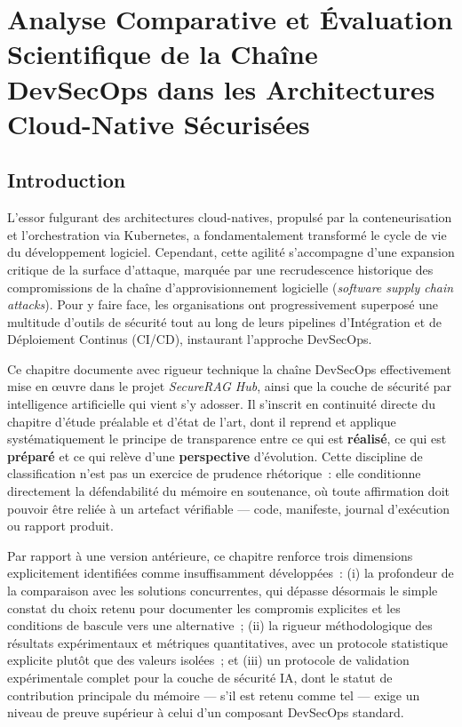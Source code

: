 \chapter{Analyse Comparative et Évaluation Scientifique de la Chaîne DevSecOps dans les Architectures Cloud-Native Sécurisées}
\label{ch:advanced_devsecops_evaluation}

\section{Introduction}

L'essor fulgurant des architectures cloud-natives, propulsé par la conteneurisation et l'orchestration via Kubernetes, a fondamentalement transformé le cycle de vie du développement logiciel. Cependant, cette agilité s'accompagne d'une expansion critique de la surface d'attaque, marquée par une recrudescence historique des compromissions de la chaîne d'approvisionnement logicielle (\textit{software supply chain attacks}). Pour y faire face, les organisations ont progressivement superposé une multitude d'outils de sécurité tout au long de leurs pipelines d'Intégration et de Déploiement Continus (CI/CD), instaurant l'approche DevSecOps.

Ce chapitre documente avec rigueur technique la chaîne DevSecOps effectivement mise en œuvre dans le projet \textit{SecureRAG Hub}, ainsi que la couche de sécurité par intelligence artificielle qui vient s'y adosser. Il s'inscrit en continuité directe du chapitre d'étude préalable et d'état de l'art, dont il reprend et applique systématiquement le principe de transparence entre ce qui est \textbf{réalisé}, ce qui est \textbf{préparé} et ce qui relève d'une \textbf{perspective} d'évolution. Cette discipline de classification n'est pas un exercice de prudence rhétorique~: elle conditionne directement la défendabilité du mémoire en soutenance, où toute affirmation doit pouvoir être reliée à un artefact vérifiable — code, manifeste, journal d'exécution ou rapport produit.

Par rapport à une version antérieure, ce chapitre renforce trois dimensions explicitement identifiées comme insuffisamment développées~: (i) la profondeur de la comparaison avec les solutions concurrentes, qui dépasse désormais le simple constat du choix retenu pour documenter les compromis explicites et les conditions de bascule vers une alternative~; (ii) la rigueur méthodologique des résultats expérimentaux et métriques quantitatives, avec un protocole statistique explicite plutôt que des valeurs isolées~; et (iii) un protocole de validation expérimentale complet pour la couche de sécurité IA, dont le statut de contribution principale du mémoire — s'il est retenu comme tel — exige un niveau de preuve supérieur à celui d'un composant DevSecOps standard.

